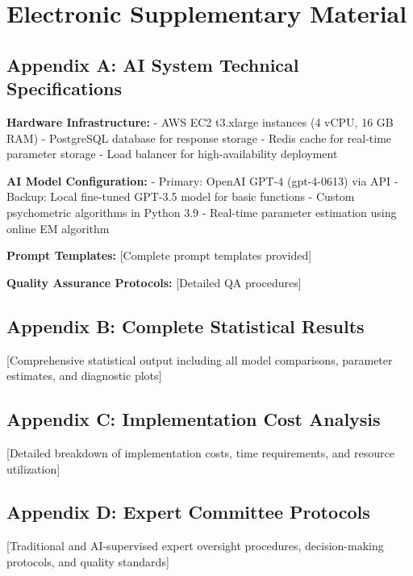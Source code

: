\documentclass[12pt,a4paper]{article}
\begin{document}
\newpage

\section{Electronic Supplementary Material}

\subsection{Appendix A: AI System Technical Specifications}

\textbf{Hardware Infrastructure:}
- AWS EC2 t3.xlarge instances (4 vCPU, 16 GB RAM)
- PostgreSQL database for response storage
- Redis cache for real-time parameter storage
- Load balancer for high-availability deployment

\textbf{AI Model Configuration:}
- Primary: OpenAI GPT-4 (gpt-4-0613) via API
- Backup: Local fine-tuned GPT-3.5 model for basic functions
- Custom psychometric algorithms in Python 3.9
- Real-time parameter estimation using online EM algorithm

\textbf{Prompt Templates:} [Complete prompt templates provided]

\textbf{Quality Assurance Protocols:} [Detailed QA procedures]

\subsection{Appendix B: Complete Statistical Results}

[Comprehensive statistical output including all model comparisons, parameter estimates, and diagnostic plots]

\subsection{Appendix C: Implementation Cost Analysis}

[Detailed breakdown of implementation costs, time requirements, and resource utilization]

\subsection{Appendix D: Expert Committee Protocols}

[Traditional and AI-supervised expert oversight procedures, decision-making protocols, and quality standards]
\end{document}
